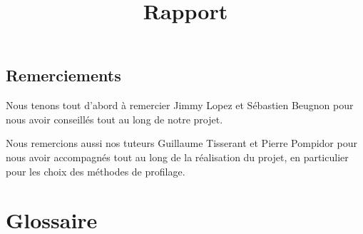 \documentclass{report}
\title{Rapport}
\author{}
\date{}
\begin{document}



\newpage
\null %
\newpage


\section*{Remerciements}
\hspace{0.5cm}Nous tenons tout d'abord à remercier Jimmy Lopez et Sébastien Beugnon pour nous avoir conseillés tout au long de notre projet.
	
	
	Nous remercions aussi nos tuteurs Guillaume Tisserant et Pierre Pompidor pour nous avoir accompagnés tout au long de la réalisation du projet, en particulier pour les choix des méthodes de profilage.

\newpage

\tableofcontents %

\newpage

\listoffigures %

\newpage
\chapter*{Glossaire}
\end{document}

